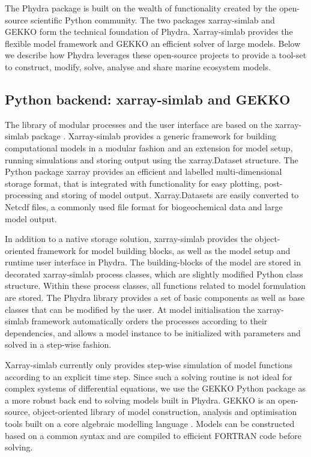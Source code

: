 \documentclass[template.tex]{subfiles}
\begin{document}
The Phydra package is built on the wealth of functionality created by the open-source scientific Python community. The two packages xarray-simlab and GEKKO form the technical foundation of Phydra. Xarray-simlab provides the flexible model framework and GEKKO an efficient solver of large models. Below we describe how Phydra leverages these open-source projects to provide a tool-set to construct, modify, solve, analyse and share marine ecosystem models. 


\subsection{Python backend: xarray-simlab and GEKKO}

The library of modular processes and the user interface are based on the xarray-simlab package \citep{Bovy2018Xarray-simlab:Interactively}. 
Xarray-simlab provides a generic framework for building computational models in a modular fashion and an extension for model setup, running simulations and storing output using the xarray.Dataset structure. The Python package xarray provides an efficient and labelled multi-dimensional storage format, that is integrated with functionality for easy plotting, post-processing and storing of model output. Xarray.Datasets are easily converted to Netcdf files, a commonly used file format for biogeochemical data and large model output. 

In addition to a native storage solution, xarray-simlab provides the object-oriented framework for model building blocks, as well as the model setup and runtime user interface in Phydra. 
The building-blocks of the model are stored in decorated xarray-simlab process classes, which are slightly modified Python class structure. Within these process classes, all functions related to model formulation are stored. The Phydra library provides a set of basic components as well as base classes that can be modified by the user. At model initialisation the xarray-simlab framework automatically orders the processes according to their dependencies, and allows a model instance to be initialized with parameters and solved in a step-wise fashion. 

Xarray-simlab currently only provides step-wise simulation of model functions according to an explicit time step. Since such a solving routine is not ideal for complex systems of differential equations, we use the GEKKO Python package as a more robust back end to solving models built in Phydra. GEKKO is an open-source, object-oriented library of model construction, analysis and optimisation tools built on a core algebraic modelling language \citep{Beal2018GEKKOSuite}. Models can be constructed based on a common syntax and are compiled to efficient FORTRAN code before solving. 
\end{document}
